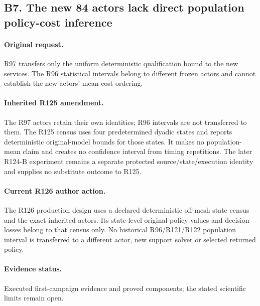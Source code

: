 \subsection*{B7. The new 84 actors lack direct population policy-cost inference}
\paragraph{Original request.} R97 transfers only the uniform deterministic qualification bound to the new services. The R96 statistical intervals belong to different frozen actors and cannot establish the new actors' mean-cost ordering.

\paragraph{Inherited R125 amendment.} The R97 actors retain their own identities; R96 intervals are not transferred to them. The R125 census uses four predetermined dyadic states and reports deterministic original-model bounds for those states. It makes no population-mean claim and creates no confidence interval from timing repetitions. The later R124-B experiment remains a separate protected source/state/execution identity and supplies no substitute outcome to R125.

\paragraph{Current R126 author action.} The R126 production design uses a declared deterministic off-mesh state census and the exact inherited actors. Its state-level original-policy values and decision losses belong to that census only. No historical R96/R121/R122 population interval is transferred to a different actor, new support solver or selected returned policy.

\paragraph{Evidence status.} Executed first-campaign evidence and proved components; the stated scientific limits remain open.


